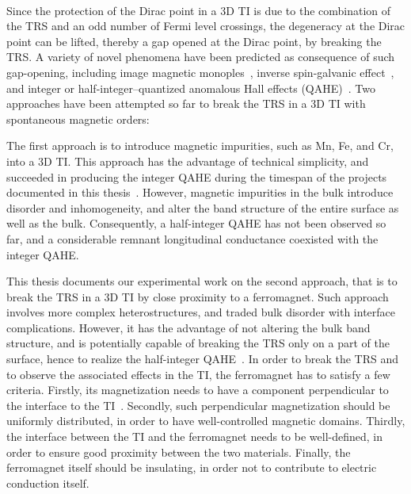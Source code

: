 \paragraph{}
Since the protection of the Dirac point in a 3D TI is due to the combination of the TRS and an odd number of Fermi level crossings, the degeneracy at the Dirac point can be lifted, thereby a gap opened at the Dirac point, by breaking the TRS. A variety of novel phenomena have been predicted as consequence of such gap-opening, including image magnetic monoples~\cite{TI_birth, TI_monopole}, inverse spin-galvanic effect~\cite{ISG}, and integer or half-integer--quantized anomalous Hall effects (QAHE)~\cite{TI_Col, QAH_TI_Yu}. Two approaches have been attempted so far to break the TRS in a 3D TI with spontaneous magnetic orders:

The first approach is to introduce magnetic impurities, such as Mn, Fe, and Cr, into a 3D TI. This approach has the advantage of technical simplicity, and succeeded in producing the integer QAHE during the timespan of the projects documented in this thesis~\cite{Chang2013, Kou2014}. However, magnetic impurities in the bulk introduce disorder and inhomogeneity, and alter the band structure of the entire surface as well as the bulk. Consequently, a half-integer QAHE has not been observed so far, and a considerable remnant longitudinal conductance coexisted with the integer QAHE.

This thesis documents our experimental work on the second approach, that is to break the TRS in a 3D TI by close proximity to a ferromagnet. Such approach involves more complex heterostructures, and traded bulk disorder with interface complications. However, it has the advantage of not altering the bulk band structure, and is potentially capable of breaking the TRS only on a part of the surface, hence to realize the half-integer QAHE~\cite{TI_Col}. In order to break the TRS and to observe the associated effects in the TI, the ferromagnet has to satisfy a few criteria. Firstly, its magnetization needs to have a component perpendicular to the interface to the TI~\cite{MnSe}. Secondly, such perpendicular magnetization should be uniformly distributed, in order to have well-controlled magnetic domains. Thirdly, the interface between the TI and the ferromagnet needs to be well-defined, in order to ensure good proximity between the two materials. Finally, the ferromagnet itself should be insulating, in order not to contribute to electric conduction itself.

